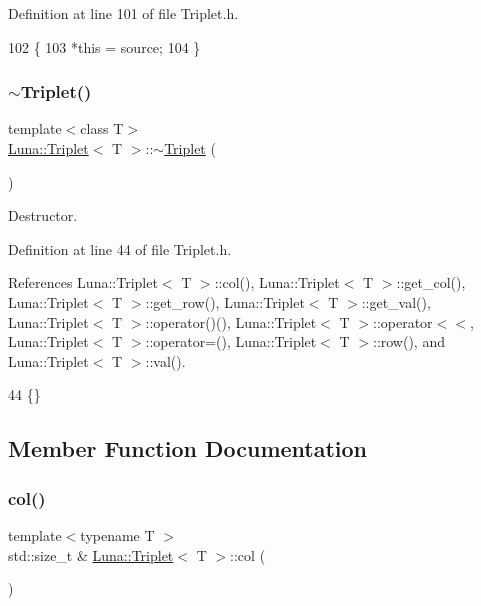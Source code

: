 Definition at line 101 of file Triplet.\+h.


\begin{DoxyCode}
102   \{
103     *\textcolor{keyword}{this} = source;
104   \}
\end{DoxyCode}
\mbox{\label{classLuna_1_1Triplet_a59099a7ab671a6c357e9ae6570b0697a}} 
\subsubsection{\texorpdfstring{$\sim$\+Triplet()}{~Triplet()}}
{\footnotesize\ttfamily template$<$class T$>$ \\
\hyperlink{classLuna_1_1Triplet}{Luna\+::\+Triplet}$<$ T $>$\+::$\sim$\hyperlink{classLuna_1_1Triplet}{Triplet} (\begin{DoxyParamCaption}{ }\end{DoxyParamCaption})\hspace{0.3cm}{\ttfamily [inline]}}



Destructor. 



Definition at line 44 of file Triplet.\+h.



References Luna\+::\+Triplet$<$ T $>$\+::col(), Luna\+::\+Triplet$<$ T $>$\+::get\+\_\+col(), Luna\+::\+Triplet$<$ T $>$\+::get\+\_\+row(), Luna\+::\+Triplet$<$ T $>$\+::get\+\_\+val(), Luna\+::\+Triplet$<$ T $>$\+::operator()(), Luna\+::\+Triplet$<$ T $>$\+::operator$<$$<$, Luna\+::\+Triplet$<$ T $>$\+::operator=(), Luna\+::\+Triplet$<$ T $>$\+::row(), and Luna\+::\+Triplet$<$ T $>$\+::val().


\begin{DoxyCode}
44 \{\}
\end{DoxyCode}


\subsection{Member Function Documentation}
\mbox{\label{classLuna_1_1Triplet_a5797cd45bf76a6baf60f7aa4741ffec2}} 
\subsubsection{\texorpdfstring{col()}{col()}}
{\footnotesize\ttfamily template$<$typename T $>$ \\
std\+::size\+\_\+t \& \hyperlink{classLuna_1_1Triplet}{Luna\+::\+Triplet}$<$ T $>$\+::col (\begin{DoxyParamCaption}{ }\end{DoxyParamCaption})\hspace{0.3cm}{\ttfamily [inline]}}



